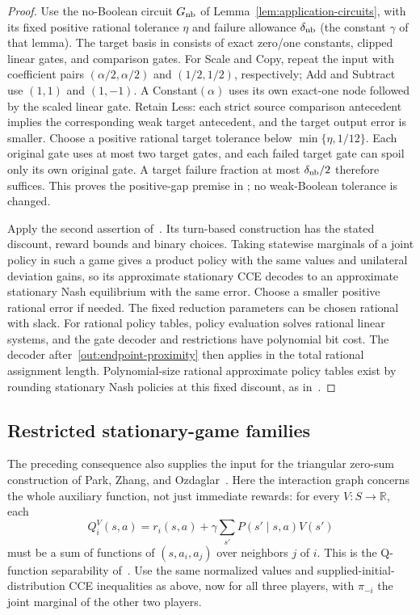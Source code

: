\begin{proof}
Use the no-Boolean circuit $G_{\rm nb}$ of
Lemma~\ref{lem:application-circuits}, with its fixed positive rational
tolerance $\eta$ and failure allowance $\delta_{\rm nb}$ (the constant
$\gamma$ of that lemma). The target basis in
\cite[Definition~8 and Appendix~D]{DGZ2023} consists of exact zero/one
constants, clipped linear gates, and comparison gates. For Scale and
Copy, repeat the input with coefficient pairs $(\alpha/2,\alpha/2)$
and $(1/2,1/2)$, respectively; Add and Subtract use $(1,1)$ and
$(1,-1)$. A Constant$(\alpha)$ uses its own exact-one node followed
by the scaled linear gate. Retain Less: each strict source comparison
antecedent implies the corresponding weak target antecedent, and the
target output error is smaller. Choose a positive rational target
tolerance below $\min\{\eta,1/12\}$. Each original gate uses at most
two target gates, and each failed target gate can spoil only its own
original gate. A target failure fraction at most $\delta_{\rm nb}/2$ therefore
suffices. This proves the positive-gap premise in
\cite[Conjecture~10]{DGZ2023}; no weak-Boolean tolerance is changed.

Apply the second assertion of~\cite[Theorem~4]{DGZ2023}. Its turn-based
construction has the stated discount, reward bounds and binary
choices. Taking statewise marginals of a joint policy in such a game
gives a product policy with the same values and unilateral deviation
gains, so its approximate stationary CCE decodes to an approximate
stationary Nash equilibrium with the same error. Choose a smaller
positive rational error if needed.
The fixed reduction parameters can be chosen rational with slack.
For rational policy tables, policy evaluation solves rational linear
systems, and the gate decoder and restrictions have polynomial bit
cost. The decoder after~\eqref{out:endpoint-proximity} then applies in
the total rational assignment length. Polynomial-size rational
approximate policy tables exist by rounding stationary Nash policies
at this fixed discount, as in~\cite[Section~2.5]{DGZ2023}.
\end{proof}

\subsection{Restricted stationary-game families}

The preceding consequence also supplies the input for the triangular
zero-sum construction of Park, Zhang, and Ozdaglar~\cite{PZO2025}.
Here the interaction graph concerns the whole auxiliary function,
not just immediate rewards: for every $V:S\to\mathbb R$, each
\[
 Q_i^V(s,a)=r_i(s,a)+\gamma\sum_{s'}P(s'\mid s,a)V(s')
\]
must be a sum of functions of $(s,a_i,a_j)$ over neighbors $j$ of $i$.
This is the Q-function separability of~\cite[Definition~1]{PZO2025}.
Use the same normalized values and supplied-initial-distribution CCE
inequalities as above, now for all three players, with $\pi_{-i}$ the
joint marginal of the other two players.

